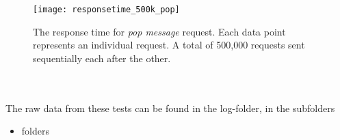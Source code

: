 \documentclass{article}
\begin{document}
                \begin{figure}[H]
                    \texttt{[image: responsetime\_500k\_pop]}
                    \caption{The response time for \textit{pop message} request. Each data point represents an individual request. A total of 500,000 requests sent sequentially each after the other.}
                    \label{fig:responsetime_500k_pop}
                \end{figure}                
                ~\\
                \\
                The raw data from these tests can be found in the log-folder, in the subfolders
                \begin{itemize}
                    \item folders
                \end{itemize}               
                
\end{document}
